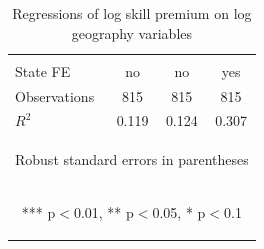 \documentclass{article}
\begin{document}
\begin{table}
\begin{tabular}{lccc}
    \vspace{4pt} & \begin{footnotesize}\end{footnotesize} & \begin{footnotesize}\end{footnotesize} & \begin{footnotesize}\end{footnotesize} \\
    State FE & \mbox{no} & \mbox{no} & \mbox{yes} \\
    Observations & 815 & 815 & 815 \\
     $R^2$ & 0.119 & 0.124 & 0.307 \\ \hline
    \multicolumn{4}{c}{\begin{footnotesize} Robust standard errors in parentheses\end{footnotesize}} \\
    \multicolumn{4}{c}{\begin{footnotesize} *** p$<$0.01, ** p$<$0.05, * p$<$0.1\end{footnotesize}} \\
    \end{tabular}
    \caption{Regressions of log skill premium on log geography variables}
    \label{tab:skill_reg}
\end{table}
\end{document}
